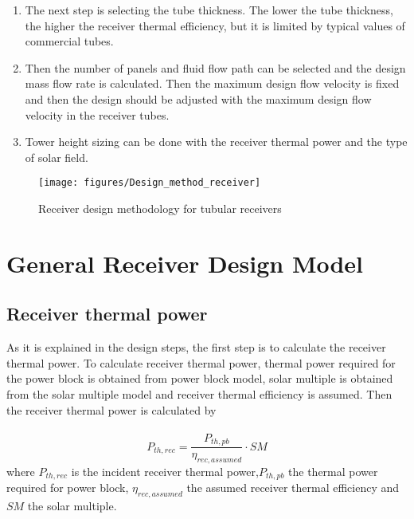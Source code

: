 \begin{enumerate}
	\item The next step is selecting the tube thickness. The lower the tube thickness, the higher the receiver thermal efficiency, but it is limited by typical values of commercial tubes.
	\item Then the number of panels and fluid flow path can be selected and the design mass flow rate is calculated. Then the maximum design flow velocity is fixed and then the design should be adjusted with the maximum design flow velocity in the receiver tubes. 
	\item Tower height sizing can be done with the receiver thermal power and the type of solar field.
\end{enumerate}
\begin{figure}[h!]
	\texttt{[image: figures/Design\_method\_receiver]}
	\centering
	\caption{Receiver design methodology for tubular receivers}	
\end{figure}
\section{General Receiver Design Model}
\subsection{Receiver thermal power}
As it is explained in the design steps, the first step is to calculate the receiver thermal power. To calculate receiver thermal power, thermal power required for the power block is obtained from power block model, solar multiple is obtained from the solar multiple model and receiver thermal efficiency is assumed. Then the receiver thermal power is calculated by \\\\
\begin{equation}
	P_{th,rec} = \frac{P_{th,pb}} {\eta_{rec,assumed}} \cdot SM
\end{equation}
where $P_{th,rec}$ is the incident receiver thermal power,$P_{th,pb}$ the thermal power required for power block, $\eta_{rec,assumed}$ the assumed receiver thermal efficiency and $SM$ the solar multiple.

